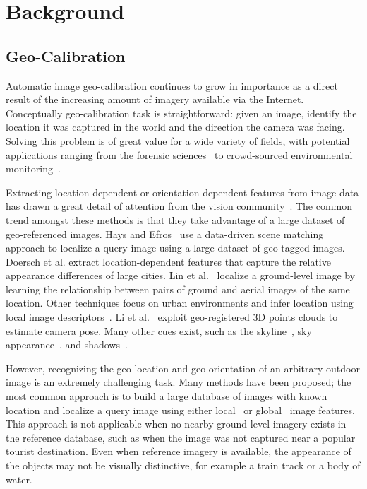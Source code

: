 \section{Background}

\subsection{Geo-Calibration}
Automatic image geo-calibration continues to grow in importance as a
direct result of the increasing amount of imagery available
via the Internet. Conceptually geo-calibration task is
straightforward: given an image, identify the location it was captured
in the world and the direction the camera was facing. Solving this
problem is of great value for a wide variety of fields, with potential
applications ranging from the forensic sciences~\cite{stylianou13jane}
to crowd-sourced environmental monitoring~\cite{zhang2012mining}.

Extracting location-dependent or orientation-dependent features from
image data has drawn a great detail of attention from the vision
community~\cite{jacobs07geolocate, jacobs11geolocate,
jacobs08geoorient}. The common trend amongst these methods is that
they take advantage of a large dataset of geo-referenced images. Hays
and Efros~\cite{hays2008im2gps} use a data-driven scene matching
approach to localize a query image using a large dataset of geo-tagged
images.  Doersch et al. extract location-dependent features that
capture the relative appearance differences of large cities.  Lin et
al.~\cite{lin2013cross} localize a ground-level image by learning the
relationship between pairs of ground and aerial images of the same
location. Other techniques focus on urban environments and infer
location using local image
descriptors~\cite{schindler2008detecting,snavely2006photo}. Li et
al.~\cite{li2012worldwide} exploit geo-registered 3D points clouds to
estimate camera pose. Many other cues exist, such as the
skyline~\cite{baatz2012large,ramalingam2009geolocalization}, sky
appearance~\cite{lalonde2010sun,workman2014rainbow}, and
shadows~\cite{junejo2008estimating,wu2010geo}.

However, recognizing the geo-location and geo-orientation of an
arbitrary outdoor image is an extremely challenging task.  Many
methods have been proposed; the most common approach is to build a
large database of images with known location and localize a query
image using either local~\cite{li2010location,schindler2008detecting}
or global~\cite{hays2008im2gps,doersch2012what} image features.  This
approach is not applicable when no nearby ground-level imagery exists
in the reference database, such as when the image was not captured
near a popular tourist destination.  Even when reference imagery is
available, the appearance of the objects may not be visually
distinctive, for example a train track or a body of water. 

